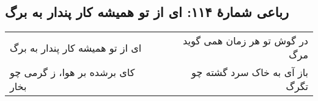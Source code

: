 \begin{center}
\section*{رباعی شمارهٔ ۱۱۴: ای از تو همیشه کار پندار به برگ}
\label{sec:114}
\begin{longtable}{l p{0.5cm} r}
ای از تو همیشه کار پندار به برگ
&&
در گوش تو هر زمان همی گوید مرگ
\\
کای برشده بر هوا، ز گرمی چو بخار
&&
باز آی به خاک سرد گشته چو تگرگ
\\
\end{longtable}
\end{center}
